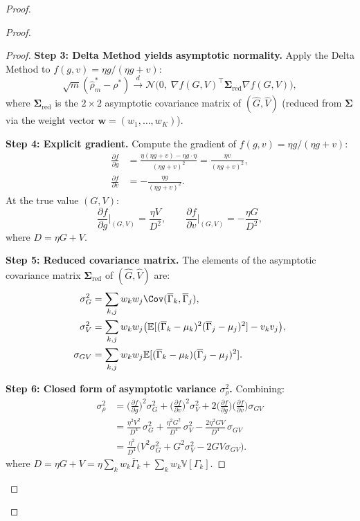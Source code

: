 \documentclass[12pt,a4paper]{article}
\newcommand{\E}{\mathbb{E}}
\newcommand{\V}{\mathbb{V}}
\begin{document}
\begin{proof}
\begin{proof}
\begin{proof}
\textbf{Step 3: Delta Method yields asymptotic normality.}
Apply the Delta Method to $f(g,v) = \eta g/(\eta g+v)$:
\[
\sqrt{m}(\hat\rho^*_m - \rho^*) \xrightarrow{d}
\mathcal{N}\!\big(0,\; \nabla f(G,V)^\top \bm\Sigma_{\text{red}} \nabla f(G,V)\big),
\]
where $\bm\Sigma_{\text{red}}$ is the $2\times2$ asymptotic covariance matrix of $(\hat G,\hat V)$
(reduced from $\bm\Sigma$ via the weight vector $\bm w = (w_1,\dots,w_K)$).

\textbf{Step 4: Explicit gradient.}
Compute the gradient of $f(g,v) = \eta g/(\eta g+v)$:
\begin{align*}
\frac{\partial f}{\partial g} &= \frac{\eta(\eta g+v) - \eta g\cdot\eta}{(\eta g+v)^2}
= \frac{\eta v}{(\eta g+v)^2},\\
\frac{\partial f}{\partial v} &= -\frac{\eta g}{(\eta g+v)^2}.
\end{align*}
At the true value $(G,V)$:
\[
\frac{\partial f}{\partial g}\Big|_{(G,V)} = \frac{\eta V}{D^2},\qquad
\frac{\partial f}{\partial v}\Big|_{(G,V)} = -\frac{\eta G}{D^2},
\]
where $D = \eta G + V$.

\textbf{Step 5: Reduced covariance matrix.}
The elements of the asymptotic covariance matrix $\bm\Sigma_{\text{red}}$ of $(\hat G, \hat V)$ are:
\begin{align*}
\sigma^2_G &= \sum_{k,j} w_k w_j \Cov(\overline{\Gamma}_k, \overline{\Gamma}_j),\\
\sigma^2_V &= \sum_{k,j} w_k w_j\big(\E[(\overline{\Gamma}_k-\mu_k)^2(\overline{\Gamma}_j-\mu_j)^2] - v_k v_j\big),\\
\sigma_{GV} &= \sum_{k,j} w_k w_j \E[(\overline{\Gamma}_k-\mu_k)(\overline{\Gamma}_j-\mu_j)^2].
\end{align*}

\textbf{Step 6: Closed form of asymptotic variance $\sigma^2_\rho$.}
Combining:
\begin{align*}
\sigma^2_\rho
&= \Big(\frac{\partial f}{\partial g}\Big)^2 \sigma^2_G
+ \Big(\frac{\partial f}{\partial v}\Big)^2 \sigma^2_V
+ 2\Big(\frac{\partial f}{\partial g}\Big)\Big(\frac{\partial f}{\partial v}\Big) \sigma_{GV} \\
&= \frac{\eta^2 V^2}{D^4}\,\sigma^2_G
+ \frac{\eta^2 G^2}{D^4}\,\sigma^2_V
- \frac{2\eta^2 G V}{D^4}\,\sigma_{GV} \\
&= \frac{\eta^2}{D^4}\Big(V^2\sigma^2_G + G^2\sigma^2_V - 2GV\sigma_{GV}\Big).
\end{align*}
where $D = \eta G + V = \eta\sum_k w_k\overline{\Gamma}_k + \sum_k w_k\V[\Gamma_k]$.


\end{proof}
\end{proof}
\end{proof}
\end{document}

